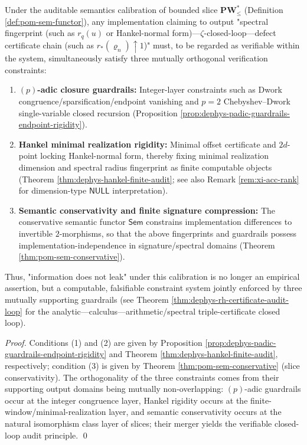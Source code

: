 \begin{theorem}\label{thm:xi-triple-consistency-audit}
Under the auditable semantics calibration of bounded slice \(\mathbf{PW}^{\ast}_{\le}\) (Definition \ref{def:pom-sem-functor}),
any implementation claiming to output "spectral fingerprint (such as \(r_q(u)\) or Hankel-normal form)—\(\zeta\)-closed-loop—defect certificate chain (such as \(r_\ast(\varrho_n)\uparrow 1\))"
must, to be regarded as verifiable within the system, simultaneously satisfy three mutually orthogonal verification constraints:
\begin{enumerate}
  \item \textbf{\((p)\)-adic closure guardrails:} Integer-layer constraints such as Dwork congruence/sparsification/endpoint vanishing and \(p=2\) Chebyshev--Dwork single-variable closed recursion (Proposition \ref{prop:dephys-padic-guardrails-endpoint-rigidity}).
  \item \textbf{Hankel minimal realization rigidity:} Minimal offset certificate and \(2d\)-point locking Hankel-normal form, thereby fixing minimal realization dimension and spectral radius fingerprint as finite computable objects (Theorem \ref{thm:dephys-hankel-finite-audit}; see also Remark \ref{rem:xi-acc-rank} for dimension-type \(\mathsf{NULL}\) interpretation).
  \item \textbf{Semantic conservativity and finite signature compression:} The conservative semantic functor \(\mathsf{Sem}\) constrains implementation differences to invertible \(2\)-morphisms, so that the above fingerprints and guardrails possess implementation-independence in signature/spectral domains (Theorem \ref{thm:pom-sem-conservative}).
\end{enumerate}
Thus, "information does not leak" under this calibration is no longer an empirical assertion, but a computable, falsifiable constraint system jointly enforced by three mutually supporting guardrails (see Theorem \ref{thm:dephys-rh-certificate-audit-loop} for the analytic—calculus—arithmetic/spectral triple-certificate closed loop).
\end{theorem}

\begin{proof}
Conditions (1) and (2) are given by Proposition \ref{prop:dephys-padic-guardrails-endpoint-rigidity} and Theorem \ref{thm:dephys-hankel-finite-audit}, respectively;
condition (3) is given by Theorem \ref{thm:pom-sem-conservative} (slice conservativity).
The orthogonality of the three constraints comes from their supporting output domains being mutually non-overlapping: \((p)\)-adic guardrails occur at the integer congruence layer, Hankel rigidity occurs at the finite-window/minimal-realization layer, and semantic conservativity occurs at the natural isomorphism class layer of slices; their merger yields the verifiable closed-loop audit principle. \qed
\end{proof}

